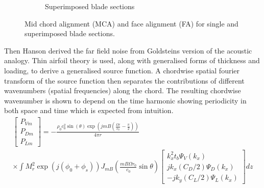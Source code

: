 \documentclass{article}
\begin{document}
\begin{figure}[H]
\begin{subfigure}[b]{0.45\textwidth}
        \caption{Superimposed blade sections}
        \label{fig:double}
    \end{subfigure}
    \caption{Mid chord alignment (MCA) and face alignment (FA) for single and superimposed blade sections.}
\end{figure}
Then Hanson derived the far field noise from Goldsteins version of the acoustic analogy.
Thin airfoil theory is used, along with generalised forms of thickness and loading, to derive a generalised source function.
A chordwise spatial fourier transform of the source function then separates the contributions of different wavenumbers (spatial frequencies) along the chord.
The resulting chordwise wavenumber is shown to depend on the time harmonic showing periodicity in both space and time which is expected from intuition.
\begin{equation}
    \begin{aligned}
        \begin{bmatrix}
            P_{Vm} \\
            P_{Dm} \\
            P_{Lm}
        \end{bmatrix} = - \frac{\rho_0 c_0^2 \sin(\theta )\exp\left(jmB \left( \frac{\Omega r}{c_0} - \frac{\pi}{2} \right)\right)}{4\pi r} \\
        \times \int M_r^2 \exp(j(\phi_0 + \phi_s)) J_{mB} \left( \frac{mB\Omega r_0}{c_0} \sin \theta \right) \begin{bmatrix}
            k_x^2 t_b \Psi_V(k_x) \\
            jk_x (C_D / 2) \Psi_D(k_x) \\
            -jk_y (C_L / 2) \Psi_L(k_x)
        \end{bmatrix}dz
    \end{aligned}
    \label{eq:hansons_result}
\end{equation}
\end{document}

